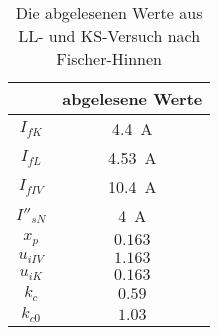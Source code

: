 \begin{table}[!ht]
\centering
\begin{tabular}{|c|c|}
\hline
            & abgelesene Werte      \\ \hline
$I_{fK}$    &  \SI{4.4}{\ampere}    \\ \hline
$I_{fL}$    & \SI{4.53}{\ampere}    \\ \hline
$I_{fIV}$   & \SI{10.4}{\ampere}    \\ \hline
$I''_{sN}$  & \SI{4}{\ampere}       \\ \hline
$x_p$       & $0.163$               \\ \hline
$u_{iIV}$   & $1.163$               \\ \hline
$u_{iK}$    & $0.163$               \\ \hline
$k_c$       & $0.59$                \\ \hline
$k_{c0}$    & $1.03$                \\ \hline
\end{tabular}
\caption{Die abgelesenen Werte aus LL- und KS-Versuch nach Fischer-Hinnen}
\label{tab:Fischer_Hinnen_abgelesene_Werte}
\end{table}

